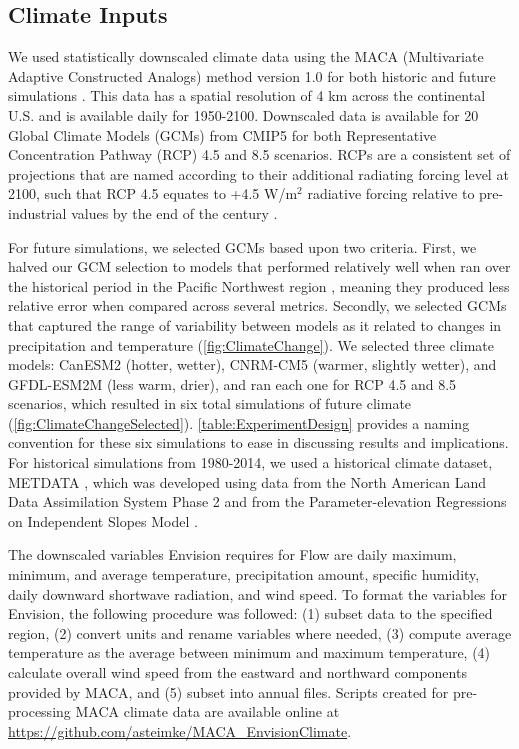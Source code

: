\documentclass[11pt,letterpaper]{article}
\begin{document}
\subsection{Climate Inputs}

We used statistically downscaled climate data using the MACA (Multivariate Adaptive Constructed Analogs) method version 1.0 for both historic and future simulations \citep{Abatzoglou:2011kca}. This data has a spatial resolution of 4 km across the continental U.S. and is available daily for 1950-2100. Downscaled data is available for 20 Global Climate Models (GCMs) from CMIP5 for both Representative Concentration Pathway (RCP) 4.5 and 8.5 scenarios. RCPs are a consistent set of projections that are named according to their additional radiating forcing level at 2100, such that RCP 4.5 equates to +4.5 W/m${}^2$ radiative forcing relative to pre-industrial values by the end of the century \citep{vanVuuren:2011tu}. 

For future simulations, we selected GCMs based upon two criteria. First, we halved our GCM selection to models that performed relatively well when ran over the historical period in the Pacific Northwest region \citep{Rupp:2013ea}, meaning they produced less relative error when compared across several metrics. Secondly, we selected GCMs that captured the range of variability between models as it related to changes in precipitation and temperature (\cref{fig:ClimateChange}). We selected three climate models: CanESM2 (hotter, wetter), CNRM-CM5 (warmer, slightly wetter), and GFDL-ESM2M (less warm, drier), and ran each one for RCP 4.5 and 8.5 scenarios, which resulted in six total simulations of future climate (\cref{fig:ClimateChangeSelected}). \cref{table:ExperimentDesign} provides a naming convention for these six simulations to ease in discussing results and implications. For historical simulations from 1980-2014, we used a historical climate dataset, METDATA \citep{Abatzoglou:2011em}, which was developed using data from the North American Land Data Assimilation System Phase 2 \citep[NLDAS-2,][]{Mitchell:2004hf} and from the Parameter-elevation Regressions on Independent Slopes Model \citep[PRISM,][]{Daly:2008hsa}.  

The downscaled variables Envision requires for Flow are daily maximum, minimum, and average temperature, precipitation amount, specific humidity, daily downward shortwave radiation, and wind speed. To format the variables for Envision, the following procedure was followed: (1) subset data to the specified region, (2) convert units and rename variables where needed, (3) compute average temperature as the average between minimum and maximum temperature, (4) calculate overall wind speed from the eastward and northward components provided by MACA, and (5) subset into annual files. Scripts created for pre-processing MACA climate data are available online at \href{https://github.com/asteimke/MACA\_EnvisionClimate}{https://github.com/asteimke/MACA\_EnvisionClimate}.
\end{document}
